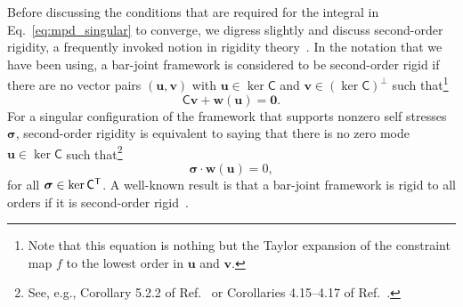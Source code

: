 Before discussing the conditions that are required for the integral in Eq.~\eqref{eq:mpd_singular} to converge, we digress slightly and discuss second-order rigidity, a frequently invoked notion in rigidity theory~\cite{connelly1994,connelly1996}.
In the notation that we have been using, a bar-joint framework is considered to be second-order rigid if there are no vector pairs $(\bm{u}, \bm{v})$ with $\bm{u} \in \ker\mathsf{C}$ and $\bm{v} \in (\ker\mathsf{C})^{\perp}$ such that\footnote{Note that this equation is nothing but the Taylor expansion of the constraint map $f$ to the lowest order in $\bm{u}$ and $\bm{v}$.}
%
\begin{equation}
  \mathsf{C}\bm{v} + \bm{w}(\bm{u}) = \bm{0}.
\end{equation}
%
For a singular configuration of the framework that supports nonzero self stresses $\bm{\sigma}$, second-order rigidity is equivalent to saying that there is no zero mode $\bm{u} \in \ker\mathsf{C}$ such that\footnote{See, e.g., Corollary 5.2.2 of Ref.~\cite{connelly1996} or Corollaries 4.15--4.17 of Ref.~\cite{williams2003}.}
%
\begin{equation}
  \bm{\sigma}\cdot\bm{w}(\bm{u}) = 0,\label{eq:2ndorder}
\end{equation}
%
for all $\bm{\sigma} \in \ker\mathsf{C}^\mathsf{T}$.
A well-known result is that a bar-joint framework is rigid to all orders if it is second-order rigid~\cite{connelly1996}.

